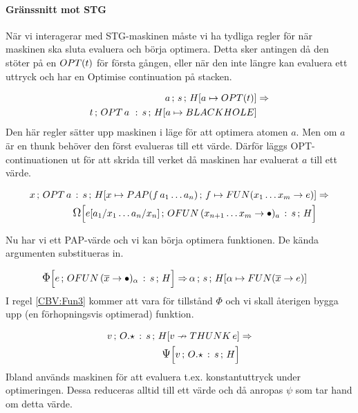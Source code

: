 \documentclass[../Optimise]{subfiles}
\begin{document}
\paragraph{Gränssnitt mot STG}
När vi interagerar med STG-maskinen måste vi ha tydliga regler
för när maskinen ska sluta evaluera och börja optimera. Detta sker
antingen då den stöter på en $\OPT t$ för första gången, eller när den
inte längre kan evaluera ett uttryck och har en Optimise continuation
på stacken.

\begin{align}
\mc as{\heap a{\OPT t}} & \Rightarrow\\
\mc t{\cOPT{a\,}s}{\heap a{\BH}} \nonumber
\end{align}
Den här regler sätter upp maskinen i läge för att optimera atomen $a$. Men om $a$
är en thunk behöver den först evalueras till ett värde. Därför läggs
OPT-continuationen ut för att skrida till verket då maskinen har evaluerat
$a$ till ett värde.

\begin{align}
\mc x{\cOPT as}{\heapp x{\PAP f{a_{1}\ldots a_{n}}}f{\FUN{x_{1}\ldots x_{m}}e}} & \Rightarrow\\
\OMEGA{\cOFUN{x_{n+1}\ldots x_{m}}as}H{e[a_{1}/x_{1}\ldots a_{n}/x_{n}]} \nonumber
\end{align}

Nu har vi ett PAP-värde och vi kan börja optimera funktionen. De kända 
argumenten substitueras in.

\begin{align}
\label{CBV:Fun3} \IRR{\cOFUN{\many{x}}{\alpha}s}He  \Rightarrow &\, \mc{\alpha}s{\heap{\alpha}{\FUN{\many{x}}e}}
\end{align}
 I regel \eqref{CBV:Fun3} kommer att vara för tillstånd
 $\Phi$ och vi skall återigen bygga upp (en förhopningsvis optimerad) funktion.

\begin{align}
\mc v{O.\star\,:\, s}{\nheap v{\THUNK e}} & \Rightarrow\\
\PSI{O.\star\,:\, s}Hv \nonumber
\end{align}
Ibland används maskinen för att evaluera t.ex. konstantuttryck under optimeringen.
Dessa reduceras alltid till ett värde och då anropas $\psi$ som tar hand 
om detta värde.
\end{document}
